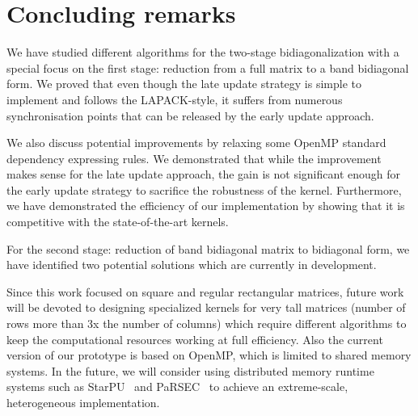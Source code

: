 \section{Concluding remarks}\label{sec:conclusion}
We have studied different algorithms for
the two-stage bidiagonalization with
a special focus on the first stage:
reduction from a full matrix to a band bidiagonal form.
We proved that even though the late update strategy
is simple to implement and follows the LAPACK-style,
it suffers from numerous synchronisation points that can be
released by the early update approach.

We also discuss potential improvements by relaxing
some OpenMP standard dependency expressing rules.
We demonstrated that while the improvement makes sense for the
late update approach,
the gain is not significant enough for the early update strategy
to sacrifice the robustness of the kernel.
Furthermore,
we have demonstrated the efficiency of our
implementation by showing that it is competitive
with the state-of-the-art kernels.

For the second stage:
reduction of band bidiagonal matrix to bidiagonal form,
we have identified two potential solutions which are
currently in development.

Since this work focused on square and regular rectangular matrices,
future work will be devoted to designing specialized kernels
for very tall matrices
(number of rows more than 3x the number of columns)
which require different algorithms to keep the
computational resources working at full efficiency.
Also the current version of our prototype is based on OpenMP,
which is limited to shared memory systems.
In the future,
we will consider using distributed memory runtime
systems such as StarPU~\cite{AugThiNamWac11CCPE} and
PaRSEC~\cite{bosilca2013parsec}
to achieve an extreme-scale, heterogeneous implementation.
